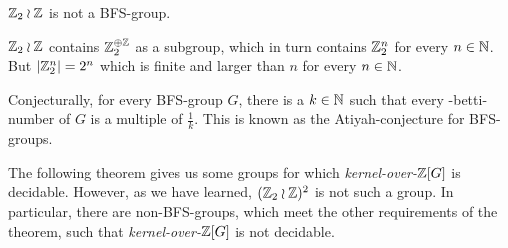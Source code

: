 \begin{Example}
	$\mathbb{Z}_2 \wr \mathbb{Z}$ is not a BFS-group.
\end{Example}
\proof
	$\mathbb{Z}_2 \wr \mathbb{Z}$ contains $\mathbb{Z}_2^{\oplus \mathbb{Z}}$ as a subgroup, which in turn contains $\mathbb{Z}_2^n$ for every $n \in \mathbb{N}$. But $|\mathbb{Z}_2^n| = 2^n$ which is finite and larger than $n$ for every $n \in \mathbb{N}$.
\endproof

Conjecturally, for every BFS-group $G$, there is a $k \in \mathbb{N}$ such that every \ltwo-betti-number of $G$ is a multiple of $\frac1k$.
This is known as the Atiyah-conjecture for BFS-groups.\footnotemark
{}

The following theorem gives us some groups for which \emph{kernel-over-$\mathbb{Z}[G]$} is decidable.
However, as we have learned, $(\mathbb{Z}_2 \wr \mathbb{Z})^2$ is not such a group.
In particular, there are non-BFS-groups, which meet the other requirements of the theorem, such that \emph{kernel-over-$\mathbb{Z}[G]$} is not decidable.

